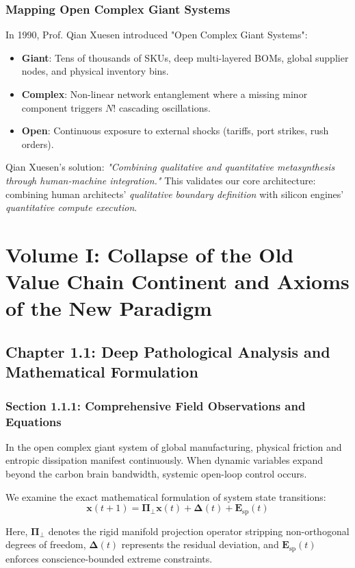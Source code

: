 \documentclass[12pt,a4paper,oneside]{book}
\begin{document}
\section*{Mapping Open Complex Giant Systems}
In 1990, Prof. Qian Xuesen introduced "Open Complex Giant Systems":
\begin{itemize}
    \item \textbf{Giant}: Tens of thousands of SKUs, deep multi-layered BOMs, global supplier nodes, and physical inventory bins.
    \item \textbf{Complex}: Non-linear network entanglement where a missing minor component triggers $N!$ cascading oscillations.
    \item \textbf{Open}: Continuous exposure to external shocks (tariffs, port strikes, rush orders).
\end{itemize}
Qian Xuesen's solution: \textit{"Combining qualitative and quantitative metasynthesis through human-machine integration."} This validates our core architecture: combining human architects' \textit{qualitative boundary definition} with silicon engines' \textit{quantitative compute execution}.
\part{Volume I: Collapse of the Old Value Chain Continent and Axioms of the New Paradigm}
\chapter{Chapter 1.1: Deep Pathological Analysis and Mathematical Formulation}
\section{Section 1.1.1: Comprehensive Field Observations and Equations}

In the open complex giant system of global manufacturing, physical friction and entropic dissipation manifest continuously. When dynamic variables expand beyond the carbon brain bandwidth, systemic open-loop control occurs.

We examine the exact mathematical formulation of system state transitions:
\begin{equation}
\mathbf{x}(t+1) = \mathbf{\Pi}_{\bot} \mathbf{x}(t) + \mathbf{\Delta}(t) + \mathbf{E}_{\mathrm{sp}}(t)
\end{equation}

Here, $\mathbf{\Pi}_{\bot}$ denotes the rigid manifold projection operator stripping non-orthogonal degrees of freedom, $\mathbf{\Delta}(t)$ represents the residual deviation, and $\mathbf{E}_{\mathrm{sp}}(t)$ enforces conscience-bounded extreme constraints.
\end{document}
